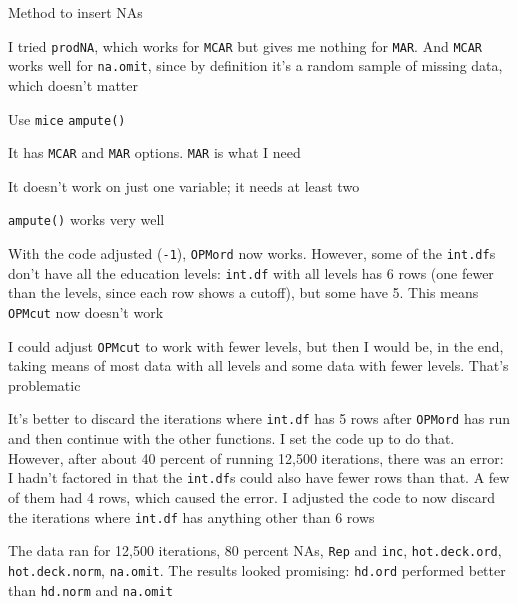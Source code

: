 \documentclass[12pt]{article}
\begin{document}
\begin{coi}
\begin{coi}
\begin{coi}
					\end{coi}
			\end{coi}
		\item Method to insert NAs
			\begin{coi}
				\item I tried \texttt{prodNA}, which works for \texttt{MCAR} but gives me nothing for \texttt{MAR}. And \texttt{MCAR} works well for \texttt{na.omit}, since by definition it's a random sample of missing data, which doesn't matter 
				\item Use \texttt{mice} \texttt{ampute()}
					\begin{coi}
						\item It has \texttt{MCAR} and \texttt{MAR} options. \texttt{MAR} is what I need
						\item It doesn't work on just one variable; it needs at least two
						\item \texttt{ampute()} works very well
					\end{coi}
			\end{coi}
		\item With the code adjusted (\texttt{-1}), \texttt{OPMord} now works. However, some of the \texttt{int.df}s don't have all the education levels: \texttt{int.df} with all levels has 6 rows (one fewer than the levels, since each row shows a cutoff), but some have 5. This means \texttt{OPMcut} now doesn't work
			\begin{coi}
				\item I could adjust \texttt{OPMcut} to work with fewer levels, but then I would be, in the end, taking means of most data with all levels and some data with fewer levels. That's problematic
				\item It's better to discard the iterations where \texttt{int.df} has 5 rows after \texttt{OPMord} has run and then continue with the other functions. I set the code up to do that. However, after about 40 percent of running 12,500 iterations, there was an error: I hadn't factored in that the \texttt{int.df}s could also have fewer rows than that. A few of them had 4 rows, which caused the error. I adjusted the code to now discard the iterations where \texttt{int.df} has anything other than 6 rows
			\end{coi}
		\item The data ran for 12,500 iterations, 80 percent NAs, \texttt{Rep} and \texttt{inc}, \texttt{hot.deck.ord}, \texttt{hot.deck.norm}, \texttt{na.omit}. The results looked promising: \texttt{hd.ord} performed better than \texttt{hd.norm} and \texttt{na.omit}

\end{coi}
\end{document}
